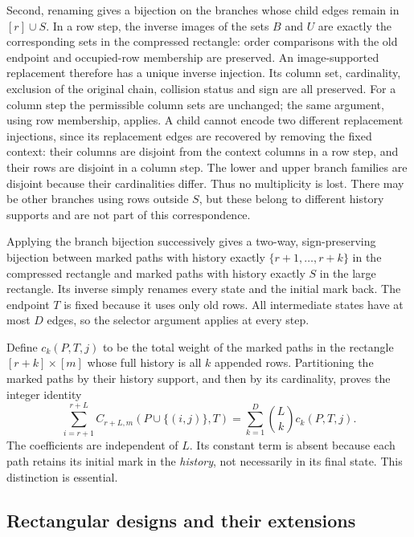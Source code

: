Second, renaming gives a bijection on the branches whose child edges
remain in $[r]\cup S$.  In a row step, the inverse images of the sets
$B$ and $U$ are exactly the corresponding sets in the compressed
rectangle: order comparisons with the old endpoint and occupied-row
membership are preserved.  An image-supported replacement therefore
has a unique inverse injection.  Its column set, cardinality, exclusion
of the original chain, collision status and sign are all preserved.
For a column step the permissible column sets are unchanged; the same
argument, using row membership, applies.  A child cannot encode two
different replacement injections, since its replacement edges are
recovered by removing the fixed context: their columns are disjoint
from the context columns in a row step, and their rows are disjoint
in a column step.  The lower and upper branch families are disjoint
because their cardinalities differ.  Thus no multiplicity is lost.
There may be other branches using rows outside $S$, but these belong to
different history supports and are not part of this correspondence.

Applying the branch bijection successively gives a two-way, sign-preserving
bijection between marked paths with history exactly
$\{r+1,\ldots,r+k\}$ in the compressed rectangle and marked paths with
history exactly $S$ in the large rectangle.  Its inverse simply renames
every state and the initial mark back.  The endpoint $T$ is fixed because
it uses only old rows.  All intermediate states have at most $D$ edges,
so the selector argument applies at every step.

Define $c_k(P,T,j)$ to be the total weight of the marked paths in the
rectangle $[r+k]\times[m]$ whose full history is all $k$ appended rows.
Partitioning the marked paths by their history support, and then by its
cardinality, proves the integer identity
\begin{equation}\label{eq:marked-coordinate}
 \sum_{i=r+1}^{r+L}
       C_{r+L,m}(P\cup\{(i,j)\},T)
    =\sum_{k=1}^{D}\binom{L}{k}c_k(P,T,j).
\end{equation}
The coefficients are independent of $L$.  Its constant term is absent
because each path retains its initial mark in the \emph{history}, not
necessarily in its final state.  This distinction is essential.

\subsection{Rectangular designs and their extensions}

